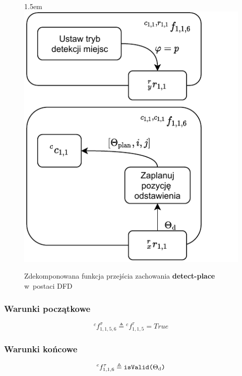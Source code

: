 \begin{figure}[ht]
    \leftskip1.5em
    \includegraphics[width=\columnwidth]{figures/ISR-cs-fp-detect-place.pdf}
    \caption{Zdekomponowana funkcja przejścia zachowania \textbf{detect-place} w~postaci DFD}
    \label{fig:cs-fp-detect-place}
\end{figure}

\subsubsection{Warunki początkowe}
\begin{equation}
    {}^{c}f^{\sigma}_{1,1,5,6} \triangleq {}^{c}f^{\tau}_{1,1,5} = True
\end{equation}

\subsubsection{Warunki końcowe}
\begin{equation}
    {}^{c}f^{\tau}_{1,1,6} \triangleq \text{\texttt{isValid($\Theta_{\mathrm{d}}$)}}
\end{equation}

